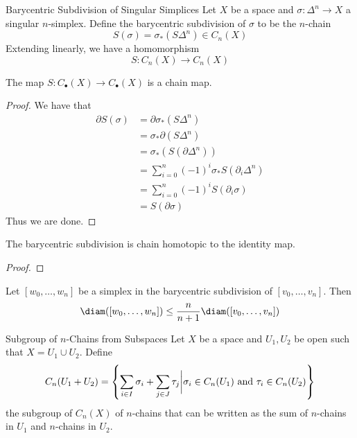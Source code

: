 \documentclass[a4paper]{article}
\begin{document}
\begin{defn}{Barycentric Subdivision of Singular Simplices}{} Let $X$ be a space and $\sigma:\Delta^n\to X$ a singular $n$-simplex. Define the barycentric subdivision of $\sigma$ to be the $n$-chain $$S(\sigma)=\sigma_\ast(S\Delta^n)\in C_n(X)$$ Extending linearly, we have a homomorphism $$S:C_n(X)\to C_n(X)$$
\end{defn}

\begin{lmm}{}{} The map $S:C_\bullet(X)\to C_\bullet(X)$ is a chain map. \tcbline
\begin{proof}
We have that 
\begin{align*}
\partial S(\sigma)&=\partial\sigma_\ast(S\Delta^n)\\
&=\sigma_\ast\partial(S\Delta^n)\tag{$\sigma_\ast$ is a chain map}\\
&=\sigma_\ast(S(\partial\Delta^n))\tag{Above lemma}\\
&=\sum_{i=0}^n(-1)^i\sigma_\ast S(\partial_i\Delta^n)\\
&=\sum_{i=0}^n(-1)^iS(\partial_i\sigma)\tag{Definition of $S$}\\
&=S(\partial\sigma)
\end{align*}
Thus we are done. 
\end{proof}
\end{lmm}

\begin{prp}{}{} The barycentric subdivision is chain homotopic to the identity map. \tcbline
\begin{proof}
\end{proof}
\end{prp}

\begin{lmm}{}{} Let $[w_0,\dots,w_n]$ be a simplex in the barycentric subdivision of $[v_0,\dots,v_n]$. Then $$\diam([w_0,\dots,w_n])\leq\frac{n}{n+1}\diam([v_0,\dots,v_n])$$
\end{lmm}

\begin{defn}{Subgroup of $n$-Chains from Subspaces}{} Let $X$ be a space and $U_1,U_2$ be open such that $X=U_1\cup U_2$. Define $$C_n(U_1+U_2)=\left\{\sum_{i\in I}\sigma_i+\sum_{j\in J}\tau_j\bigg{|}\sigma_i\in C_n(U_1)\text{ and }\tau_i\in C_n(U_2)\right\}$$ the subgroup of $C_n(X)$ of $n$-chains that can be written as the sum of $n$-chains in $U_1$ and $n$-chains in $U_2$. 
\end{defn}
\end{document}

